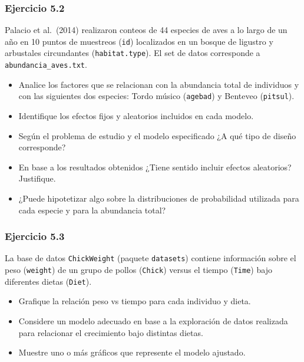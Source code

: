\documentclass[
]{book}
\begin{document}
\hypertarget{ejercicio-5.2}{%
\subsubsection{Ejercicio 5.2}\label{ejercicio-5.2}}

Palacio et al.~(2014) realizaron conteos de 44 especies de aves a lo largo de un año en 10 puntos de muestreos (\texttt{id}) localizados en un bosque de ligustro y arbustales circundantes (\texttt{habitat.type}). El set de datos corresponde a \texttt{abundancia\_aves.txt}.

\begin{itemize}
\item
  Analice los factores que se relacionan con la abundancia total de individuos y con las siguientes dos especies: Tordo músico (\texttt{agebad}) y Benteveo (\texttt{pitsul}).
\item
  Identifique los efectos fijos y aleatorios incluidos en cada modelo.
\item
  Según el problema de estudio y el modelo especificado ¿A qué tipo de diseño corresponde?
\item
  En base a los resultados obtenidos ¿Tiene sentido incluir efectos aleatorios? Justifique.
\item
  ¿Puede hipotetizar algo sobre la distribuciones de probabilidad utilizada para cada especie y para la abundancia total?
\end{itemize}

\hypertarget{ejercicio-5.3}{%
\subsubsection{Ejercicio 5.3}\label{ejercicio-5.3}}

La base de datos \texttt{ChickWeight} (paquete \texttt{datasets}) contiene información sobre el peso (\texttt{weight}) de un grupo de pollos (\texttt{Chick}) versus el tiempo (\texttt{Time}) bajo diferentes dietas (\texttt{Diet}).

\begin{itemize}
\item
  Grafique la relación peso vs tiempo para cada individuo y dieta.
\item
  Considere un modelo adecuado en base a la exploración de datos realizada para relacionar el crecimiento bajo distintas dietas.
\item
  Muestre uno o más gráficos que represente el modelo ajustado.
\end{itemize}
\end{document}
